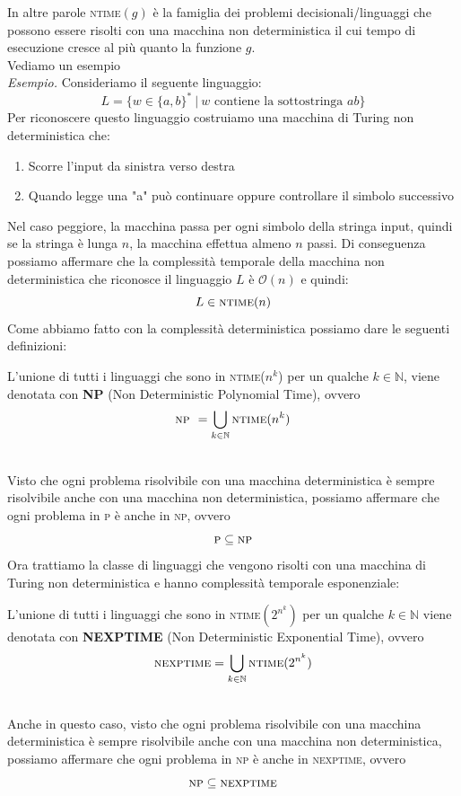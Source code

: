In altre parole \textsc{ntime}$(g)$ è la famiglia dei problemi decisionali/linguaggi che possono essere risolti con una macchina non deterministica il cui tempo di esecuzione cresce al più quanto la funzione $g$.\smallskip\\
Vediamo un esempio\smallskip\\
\textit{Esempio.} Consideriamo il seguente linguaggio:
\[     L = \big\{   w \in \{a,b\}^* \ | \ w \text{ contiene la sottostringa } ab   \big\}   \]
Per riconoscere questo linguaggio costruiamo una macchina di Turing non deterministica che:
\begin{enumerate}
    \item Scorre l'input da sinistra verso destra 
    \item Quando legge una "a" può continuare oppure controllare il simbolo successivo 
\end{enumerate} 
Nel caso peggiore, la macchina passa per ogni simbolo della stringa input, quindi se la stringa è lunga $n$, la macchina effettua almeno $n$ passi. Di conseguenza possiamo affermare che la complessità temporale 
della macchina non deterministica che riconosce il linguaggio $L$ è $\mathcal{O}(n)$ e quindi:
\[    L \in \textsc{ntime}(n)    \]  
Come abbiamo fatto con la complessità deterministica possiamo dare le seguenti definizioni:\smallskip\\ \label{np}
\colorbox{SALZO}{\parbox{\dimexpr\linewidth-2\fboxsep}{\begin{definition}
    L'unione di tutti i linguaggi che sono in \textsc{ntime}($n^k$) per un qualche $k \in \mathbb{N}$, viene denotata con \textbf{NP} (Non Deterministic Polynomial Time), ovvero
    \[     \textsc{np } = \bigcup_{k \in \mathbb{N}} \textsc{ntime}(n^k)  \]
\end{definition}}}\smallskip\\
Visto che ogni problema risolvibile con una macchina deterministica è sempre risolvibile anche con una macchina non deterministica, possiamo affermare che ogni problema in \textsc{p} è anche in \textsc{np}, ovvero
\[    \textsc{p} \subseteq \textsc{np}  \]
Ora trattiamo la classe di linguaggi che vengono risolti con una macchina di Turing non deterministica e hanno complessità temporale esponenziale:\smallskip\\
 \colorbox{SALZO}{\parbox{\dimexpr\linewidth-2\fboxsep}{\begin{definition}
    L'unione di tutti i linguaggi che sono in \textsc{ntime}$(2^{n^k})$ per un qualche $k \in \mathbb{N}$ viene denotata con \textbf{NEXPTIME} (Non Deterministic Exponential Time), ovvero
    \[    \textsc{nexptime} = \bigcup_{k \in \mathbb{N}} \textsc{ntime}(2^{n^k})    \]
\end{definition}}}\smallskip\\
Anche in questo caso, visto che ogni problema risolvibile con una macchina deterministica è sempre risolvibile anche con una macchina non deterministica, possiamo affermare che ogni problema in \textsc{np} è anche
in \textsc{nexptime}, ovvero
\[   \textsc{np} \subseteq \textsc{nexptime}        \]


